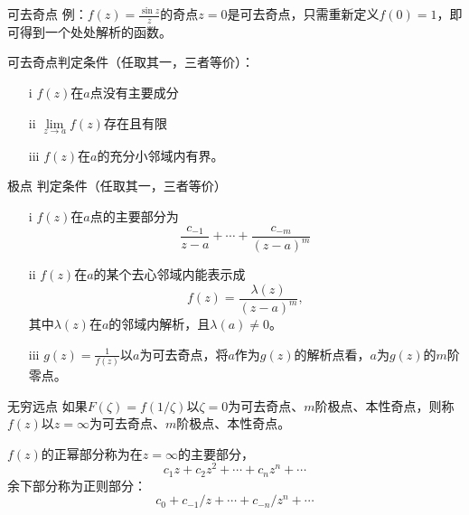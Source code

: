 \documentclass[11pt]{beamer}
\newcommand{\kong}[1][0.5]{\vspace{#1cm}}
\begin{document}
\begin{frame}{可去奇点}
例：$f(z) = \frac{\sin z}{z}$的奇点$z=0$是可去奇点，只需重新定义$f(0)=1$，即可得到一个处处解析的函数。

\kong[1]
可去奇点判定条件（任取其一，三者等价）：
\begin{itemize}
	\item [i] $f(z)$在$a$点没有主要成分
	\item [ii] $\lim\limits_{z \rightarrow a} f(z)$存在且有限
	\item [iii] $f(z)$在$a$的充分小邻域内有界。
\end{itemize}

\end{frame}

\begin{frame}{极点}
判定条件（任取其一，三者等价）
\begin{itemize}
	\item [i] $f(z)$在$a$点的主要部分为
		\begin{equation}
	\frac{c_{-1}}{z-a} + \cdots + \frac{c_{-m}}{(z-a)^m}
	\end{equation}
	\item [ii] $f(z)$在$a$的某个去心邻域内能表示成
	\begin{equation}
		f(z) = \frac{\lambda(z)}{(z-a)^m},
	\end{equation}
	其中$\lambda(z)$在$a$的邻域内解析，且$\lambda(a) \neq 0$。
	\item [iii] $g(z) = \frac{1}{f(z)}$以$a$为可去奇点，将$a$作为$g(z)$的解析点看，$a$为$g(z)$的$m$阶零点。
\end{itemize}
\end{frame}


\begin{frame}{无穷远点}
如果$F(\zeta) = f(1/\zeta)$以$\zeta = 0$为可去奇点、$m$阶极点、本性奇点，则称$f(z)$以$z=\infty$为可去奇点、$m$阶极点、本性奇点。

\kong[0.5]
$f(z)$的正幂部分称为在$z=\infty$的主要部分，
\begin{equation}
c_1 z + c_2 z^2 + \cdots + c_n z^n + \cdots
\end{equation}
余下部分称为正则部分：
\begin{equation}
c_0 + c_{-1}/z + \cdots + c_{-n} / z^n + \cdots
\end{equation}

\end{frame}
\end{document}
